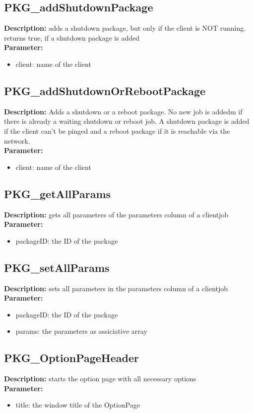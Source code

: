 \subsection{PKG\_addShutdownPackage}
\textbf{Description:} adds a shutdown package, but only if the client is NOT running. returns true, if a shutdown package is added\\
\textbf{Parameter:}
\begin{itemize}
\item client: name of the client
\end{itemize}

\subsection{PKG\_addShutdownOrRebootPackage}
\textbf{Description:} Adds a shutdown or a reboot package. No new job is addedm if there is already a waiting shutdown or reboot job. A shutdown package is added if the client can't be pinged and a reboot package if it is reachable via the network.\\
\textbf{Parameter:}
\begin{itemize}
\item client: name of the client
\end{itemize}

\subsection{PKG\_getAllParams}
\textbf{Description:} gets all parameters of the parameters column of a clientjob\\
\textbf{Parameter:}
\begin{itemize}
\item packageID: the ID of the package
\end{itemize}

\subsection{PKG\_setAllParams}
\textbf{Description:} sets all parameters in the parameters column of a clientjob\\
\textbf{Parameter:}
\begin{itemize}
\item packageID: the ID of the package
\item params: the parameters as assiciative array
\end{itemize}

\subsection{PKG\_OptionPageHeader}
\textbf{Description:} starts the option page with all necessary options\\
\textbf{Parameter:}
\begin{itemize}
\item title: the window title of the OptionPage
\end{itemize}

